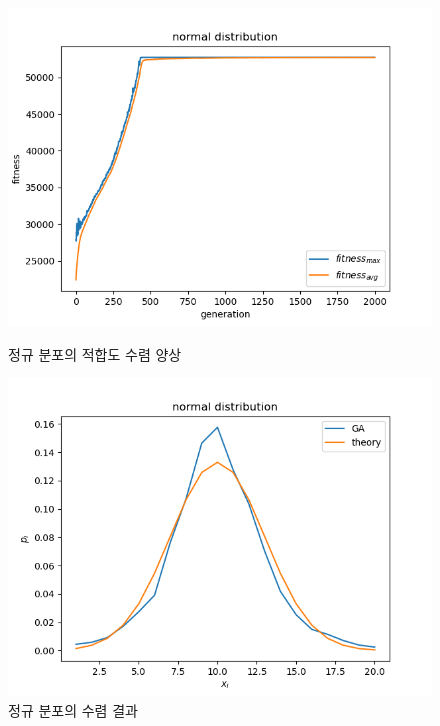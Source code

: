 \begin{figure}[!htb]
    \centering
    \begin{minipage}{.5\textwidth}
        \centering
        \includegraphics[width=\linewidth, height=0.63\linewidth]{images/normal convergence fitness.png}
        \caption{정규 분포의 적합도 수렴 양상}
        \label{fig:normal fitness}
    \end{minipage}%
    \begin{minipage}{0.5\textwidth}
        \centering
        \includegraphics[width=\linewidth, height=0.63\linewidth]{images/normal result.png}
        \caption{정규 분포의 수렴 결과}
        \label{fig:normal result}
    \end{minipage}
\end{figure}